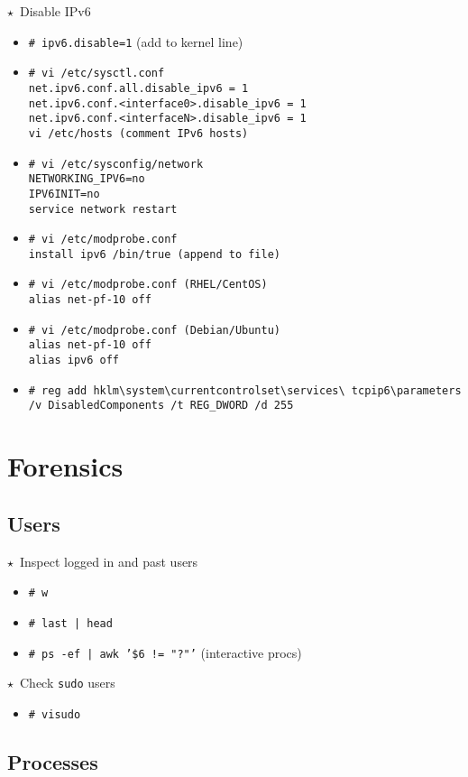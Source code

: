 \documentclass[10pt,landscape]{article}
\newcommand{\os}[1]{\texttt{\footnotesize{#1}}}
\newcommand{\unix}{\os{U}}
\newcommand{\linux}{\os{L}}
\newcommand{\windows}{\os{W}}
\newenvironment{action}[1]
  {\begin{minipage}[c]{\linewidth}$\star$~#1\begin{itemize}[leftmargin=1cm]}
  {\end{itemize}\end{minipage}\vspace*{3pt}}
\newcommand{\cmd}[2]{\item[#1] {\small\tt\# #2}}
\newcommand{\comment}[1]{\textrm{\small(#1)}}
\begin{document}
\begin{multicols*}{3}
\begin{action}{Disable IPv6}
  \cmd{\linux}{ipv6.disable=1} \comment{add to kernel line}
  \cmd{\linux}{vi /etc/sysctl.conf\\
    net.ipv6.conf.all.disable\_ipv6 = 1\\
    net.ipv6.conf.<interface0>.disable\_ipv6 = 1\\
    net.ipv6.conf.<interfaceN>.disable\_ipv6 = 1\\
    vi /etc/hosts \comment{comment IPv6 hosts}}
  \cmd{\linux}{vi /etc/sysconfig/network\\
    NETWORKING\_IPV6=no\\
    IPV6INIT=no\\
    service network restart}
  \cmd{\linux}{vi /etc/modprobe.conf\\
    install ipv6 /bin/true \comment{append to file}}
  \cmd{\linux}{vi /etc/modprobe.conf  \comment{RHEL/CentOS}\\
    alias net-pf-10 off}
  \cmd{\linux}{vi /etc/modprobe.conf \comment{Debian/Ubuntu}\\
    alias net-pf-10 off \\
    alias ipv6 off}
    \cmd{\windows}{reg add
    hklm{\textbackslash}system{\textbackslash}currentcontrolset{\textbackslash}services{\textbackslash}
    tcpip6{\textbackslash}parameters /v DisabledComponents /t REG\_DWORD /d 255}
\end{action}

\section*{Forensics}

\subsection*{Users}

\begin{action}{Inspect logged in and past users}
  \cmd{\unix}{w}
  \cmd{\unix}{last | head}
  \cmd{\unix}{ps -ef | awk '\$6 != "?"'} (interactive procs)
\end{action}

\begin{action}{Check \texttt{sudo} users}
  \cmd{\unix}{visudo}
\end{action}

\subsection*{Processes}


\end{multicols*}
\end{document}
